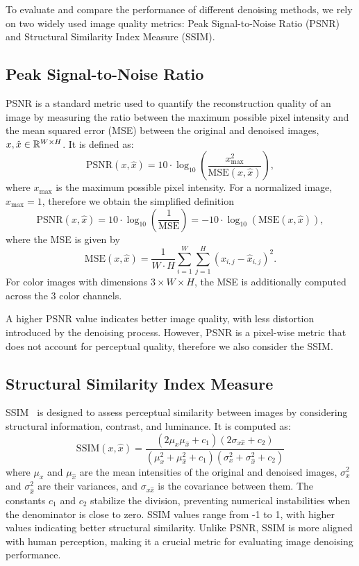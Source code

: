 To evaluate and compare the performance of different denoising methods, we rely on two widely used image quality metrics: Peak Signal-to-Noise Ratio (PSNR) and Structural Similarity Index Measure (SSIM).

\subsection{Peak Signal-to-Noise Ratio}

PSNR is a standard metric used to quantify the reconstruction quality of an image by measuring the ratio between the maximum possible pixel intensity and the mean squared error (MSE) between the original and denoised images, $x, \hat{x} \in \mathbb{R}^{W \times H}$.
It is defined as:
\begin{equation}
    \text{PSNR}(x,\hat{x}) = 10 \cdot \log_{10} \left(\frac{x_{\text{max}}^2}{\text{MSE}(x,\hat{x})}\right),
\end{equation}
where $x_{\text{max}}$ is the maximum possible pixel intensity.
For a normalized image, $x_{\text{max}} = 1$, therefore we obtain the simplified definition
\begin{equation}\label{eq:PSNR}
    \text{PSNR}(x,\hat{x}) = 10 \cdot \log_{10} \left(\frac{1}{\text{MSE}}\right) = -10 \cdot \log_{10}(\text{MSE}(x,\hat{x})),
\end{equation}
where the MSE is given by
\begin{equation}\label{eq:MSE}
    \text{MSE}(x,\hat{x}) = \frac{1}{W \cdot H} \sum_{i=1}^{W} \sum_{j=1}^{H} (x_{i,j} - \hat{x}_{i,j})^2.
\end{equation}
For color images with dimensions $3 \times W \times H$, the MSE is additionally computed across the 3 color channels.

A higher PSNR value indicates better image quality, with less distortion introduced by the denoising process.
However, PSNR is a pixel-wise metric that does not account for perceptual quality, therefore we also consider the SSIM\@.

\subsection{Structural Similarity Index Measure}

SSIM~\cite{SSIM} is designed to assess perceptual similarity between images by considering structural information, contrast, and luminance. It is computed as:
\begin{equation}
\text{SSIM}(x, \hat{x}) = \frac{(2\mu_x \mu_{\hat{x}} + c_1)(2\sigma_{x\hat{x}} + c_2)}{(\mu_x^2 + \mu_{\hat{x}}^2 + c_1)(\sigma_x^2 + \sigma_{\hat{x}}^2 + c_2)}
\end{equation}
where $\mu_x$ and $\mu_{\hat{x}}$ are the mean intensities of the original and denoised images, $\sigma_x^2$ and $\sigma_{\hat{x}}^2$ are their variances, and $\sigma_{x\hat{x}}$ is the covariance between them.
The constants $c_1$ and $c_2$ stabilize the division, preventing numerical instabilities when the denominator is close to zero.
SSIM values range from -1 to 1, with higher values indicating better structural similarity.
Unlike PSNR, SSIM is more aligned with human perception, making it a crucial metric for evaluating image denoising performance.

